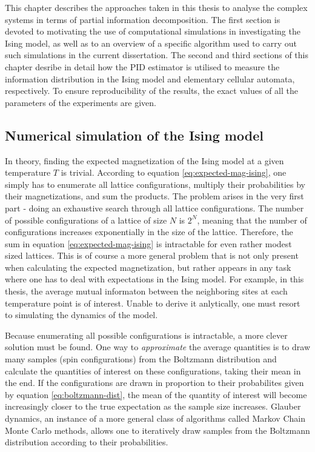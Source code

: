 \documentclass[12pt]{article}
\begin{document}
This chapter describes the approaches taken in this thesis to analyse the complex systems in terms of partial information decomposition. The first section is devoted to motivating the use of computational simulations in investigating the Ising model, as well as to an overview of a specific algorithm used to carry out such simulations in the current dissertation. The second and third sections of this chapter desribe in detail how the PID estimator is utilised to measure the information distribution in the Ising model and elementary cellular automata, respectively. To ensure reproducibility of the results, the exact values of all the parameters of the experiments are given. 

\subsection{Numerical simulation of the Ising model}

In theory, finding the expected magnetization of the Ising model at a given temperature $T$ is trivial. According to equation \ref{eq:expected-mag-ising}, one simply has to enumerate all lattice configurations, multiply their probabilities by their magnetizations, and sum the products. The problem arises in the very first part - doing an exhaustive search through all lattice configurations. The number of possible configurations of a lattice of size $N$ is $2^N$, meaning that the number of configurations increases exponentially in the size of the lattice. Therefore, the sum in equation \ref{eq:expected-mag-ising} is intractable for even rather modest sized lattices. This is of course a more general problem that is not only present when calculating the expected magnetization, but rather appears in any task where one has to deal with expectations in the Ising model. For example, in this thesis, 
the average mutual informaton between the neighboring sites at each temperature point is of interest. Unable to derive it anlytically, one must resort to simulating the dynamics of the model. 

Because enumerating all possible configurations is intractable, a more clever solution must be found. One way to \textit{approximate} the average quantities is to draw many samples (spin configurations) from the Boltzmann distribution and calculate the quantities of interest on these configurations, taking their mean in the end. If the configurations are drawn in proportion to their probabilites given by equation \ref{eq:boltzmann-dist}, the mean of the quantity of interest will become increasingly closer to the true expectation as the sample size increases. Glauber dynamics, an instance of a more general class of algorithms called Markov Chain Monte Carlo methods, allows one to iteratively draw samples from the Boltzmann distribution according to their probabilities.
\end{document}
